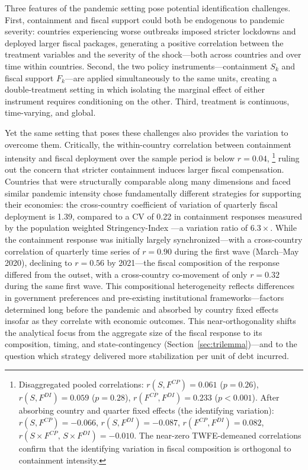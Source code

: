 \documentclass[12pt, a4paper]{article}
\begin{document}
Three features of the pandemic setting pose potential identification challenges. First, containment and fiscal support could both be endogenous to pandemic severity: countries experiencing worse outbreaks imposed stricter lockdowns and deployed larger fiscal packages, generating a positive correlation between the treatment variables and the severity of the shock---both across countries and over time within countries.
Second, the two policy instruments---containment $S_k$ and fiscal support
$F_k$---are applied simultaneously to the same units, creating a double-treatment
setting in which isolating the marginal effect of either instrument requires
conditioning on the other. Third, treatment is continuous, time-varying, and global.

Yet the same setting that poses these challenges also provides the variation to
overcome them. Critically, the within-country correlation between containment
intensity and fiscal deployment over the sample period is below $r = 0.04$,  \footnote{Disaggregated pooled correlations: $r(S, F^{CP}) = 0.061$
($p = 0.26$), $r(S, F^{DI}) = 0.059$ ($p = 0.28$),
$r(F^{CP}, F^{DI}) = 0.233$ ($p < 0.001$). After absorbing country and
quarter fixed effects (the identifying variation): $r(S, F^{CP}) = -0.066$,
$r(S, F^{DI}) = -0.087$, $r(F^{CP}, F^{DI}) = 0.082$,
$r(S \times F^{CP},\, S \times F^{DI}) = -0.010$. The near-zero
TWFE-demeaned correlations confirm that the identifying variation in
fiscal composition is orthogonal to containment intensity.} ruling out
the concern that stricter containment induces larger fiscal compensation. Countries
that were structurally comparable along many dimensions and faced similar pandemic
intensity chose fundamentally different strategies for supporting their economies: the
cross-country coefficient of variation of quarterly fiscal deployment is 1.39,
compared to a CV of 0.22 in containment responses measured by the population weighted Stringency-Index \citep{Hale2021}---a variation ratio of $6.3\times$. While the containment response was initially largely synchronized---with a cross-country correlation of quarterly time series of $r = 0.90$ during the first wave (March--May 2020), declining to $r = 0.56$ by 2021---the fiscal composition of the response differed from the outset, with a cross-country co-movement of only $r = 0.32$ during the same first wave.  This compositional heterogeneity reflects differences in government preferences and pre-existing institutional frameworks---factors determined long before the pandemic and absorbed by country fixed effects insofar as they correlate with economic outcomes. This near-orthogonality shifts the analytical focus from the aggregate size of the fiscal response to its composition, timing, and
state-contingency (Section~\ref{sec:trilemma})---and to the question which
strategy delivered more stabilization per unit of debt incurred.
\end{document}
